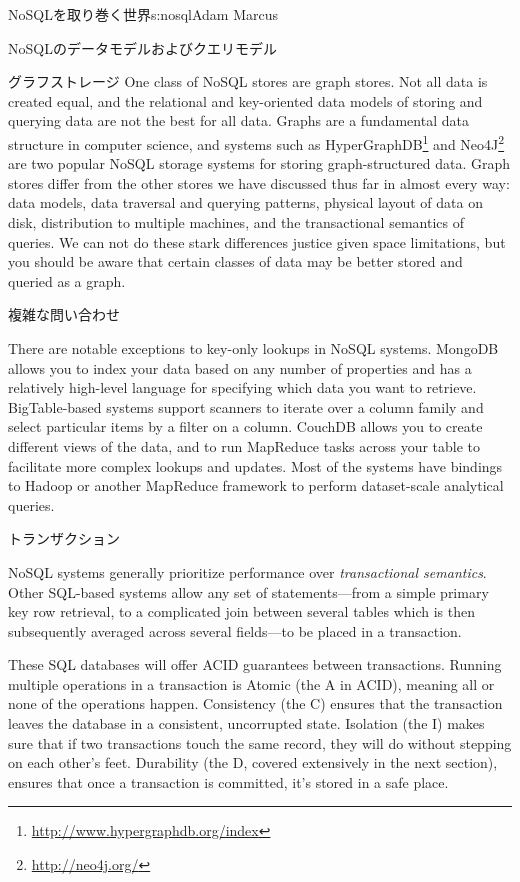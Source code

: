 \begin{aosachapter}{NoSQLを取り巻く世界}{s:nosql}{Adam Marcus}
\begin{aosasect1}{NoSQLのデータモデルおよびクエリモデル}
\begin{aosasect2}{グラフストレージ}
One class of NoSQL stores are graph stores.  Not all data is created
equal, and the relational and key-oriented data models of storing and
querying data are not the best for all data.  Graphs are a fundamental
data structure in computer science, and systems such as HyperGraphDB\footnote{\url{http://www.hypergraphdb.org/index}}
and Neo4J\footnote{\url{http://neo4j.org/}} are two popular NoSQL storage systems for storing
graph-structured data.  Graph stores differ from the other stores we
have discussed thus far in almost every way: data models, data
traversal and querying patterns, physical layout of data on disk,
distribution to multiple machines, and the transactional semantics of
queries.  We can not do these stark differences justice given space
limitations, but you should be aware that certain classes of data may
be better stored and queried as a graph.

\end{aosasect2}

\begin{aosasect2}{複雑な問い合わせ}

There are notable exceptions to key-only lookups in NoSQL systems.
MongoDB allows you to index your data based on any number of
properties and has a relatively high-level language for specifying
which data you want to retrieve.  BigTable-based systems support
scanners to iterate over a column family and select particular items by a
filter on a column.  CouchDB allows you to create different views of
the data, and to run MapReduce tasks across your table to facilitate
more complex lookups and updates.  Most of the systems have bindings
to Hadoop or another MapReduce framework to perform dataset-scale
analytical queries.

\end{aosasect2}

\begin{aosasect2}{トランザクション}

NoSQL systems generally prioritize performance over
\emph{transactional semantics}.  Other SQL-based systems allow any set
of statements---from a simple primary key row retrieval, to a
complicated join between several tables which is then subsequently
averaged across several fields---to be placed in a transaction.

These SQL databases will offer ACID guarantees between transactions.
Running multiple operations in a transaction is Atomic (the A in
ACID), meaning all or none of the operations happen.  Consistency (the
C) ensures that the transaction leaves the database in a consistent,
uncorrupted state.  Isolation (the I) makes sure that if two
transactions touch the same record, they will do without stepping on
each other's feet.  Durability (the D, covered extensively in the next
section), ensures that once a transaction is committed, it's stored in
a safe place.


\end{aosasect2}
\end{aosasect1}
\end{aosachapter}
